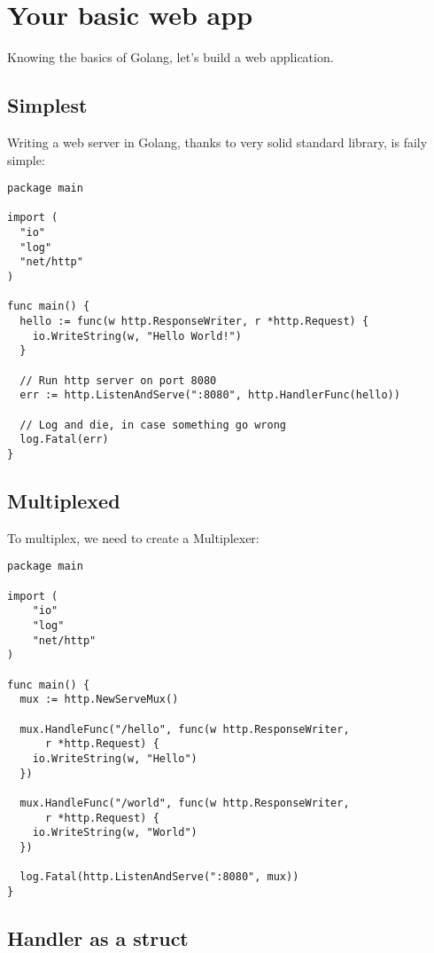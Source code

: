 \documentclass[11pt, letterpaper]{article}
\begin{document}
\pagebreak
\section{Your basic web app}

Knowing the basics of Golang, let's build a web application.

\subsection{Simplest}

Writing a web server in Golang, thanks to very solid standard library, is faily simple:

\begin{verbatim}
package main

import (
  "io"
  "log"
  "net/http"
)

func main() {
  hello := func(w http.ResponseWriter, r *http.Request) {
    io.WriteString(w, "Hello World!")
  }

  // Run http server on port 8080
  err := http.ListenAndServe(":8080", http.HandlerFunc(hello))

  // Log and die, in case something go wrong
  log.Fatal(err)
}
\end{verbatim}

\subsection{Multiplexed}

To multiplex, we need to create a Multiplexer:

\begin{verbatim}
package main

import (
    "io"
    "log"
    "net/http"
)

func main() {
  mux := http.NewServeMux()

  mux.HandleFunc("/hello", func(w http.ResponseWriter,
      r *http.Request) {
    io.WriteString(w, "Hello")
  })
  
  mux.HandleFunc("/world", func(w http.ResponseWriter,
      r *http.Request) {
    io.WriteString(w, "World")
  })

  log.Fatal(http.ListenAndServe(":8080", mux))
}
\end{verbatim}


\subsection{Handler as a struct}
\end{document}
